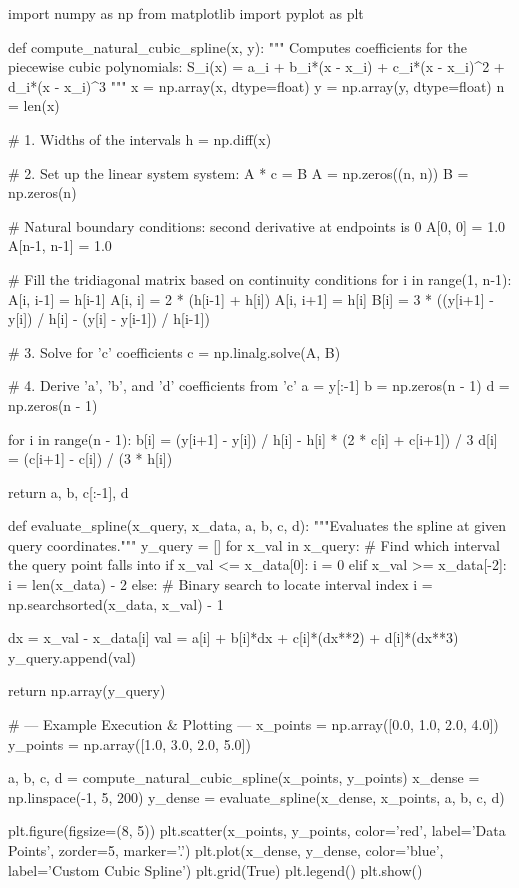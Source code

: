 \documentclass{article}
\begin{document}
\begin{jupytercode}
import numpy as np 
from matplotlib import pyplot as plt 

def compute_natural_cubic_spline(x, y):
    """
    Computes coefficients for the piecewise cubic polynomials:
    S_i(x) = a_i + b_i*(x - x_i) + c_i*(x - x_i)^2 + d_i*(x - x_i)^3
    """
    x = np.array(x, dtype=float)
    y = np.array(y, dtype=float)
    n = len(x)
    
    # 1. Widths of the intervals
    h = np.diff(x)
    
    # 2. Set up the linear system system: A * c = B
    A = np.zeros((n, n))
    B = np.zeros(n)
    
    # Natural boundary conditions: second derivative at endpoints is 0
    A[0, 0] = 1.0
    A[n-1, n-1] = 1.0
    
    # Fill the tridiagonal matrix based on continuity conditions
    for i in range(1, n-1):
        A[i, i-1] = h[i-1]
        A[i, i] = 2 * (h[i-1] + h[i])
        A[i, i+1] = h[i]
        B[i] = 3 * ((y[i+1] - y[i]) / h[i] - (y[i] - y[i-1]) / h[i-1])
        
    # 3. Solve for 'c' coefficients
    c = np.linalg.solve(A, B)
    
    # 4. Derive 'a', 'b', and 'd' coefficients from 'c'
    a = y[:-1]
    b = np.zeros(n - 1)
    d = np.zeros(n - 1)
    
    for i in range(n - 1):
        b[i] = (y[i+1] - y[i]) / h[i] - h[i] * (2 * c[i] + c[i+1]) / 3
        d[i] = (c[i+1] - c[i]) / (3 * h[i])
        
    return a, b, c[:-1], d

def evaluate_spline(x_query, x_data, a, b, c, d):
    """Evaluates the spline at given query coordinates."""
    y_query = []
    for x_val in x_query:
        # Find which interval the query point falls into
        if x_val <= x_data[0]:
            i = 0
        elif x_val >= x_data[-2]:
            i = len(x_data) - 2
        else:
            # Binary search to locate interval index
            i = np.searchsorted(x_data, x_val) - 1
            
        dx = x_val - x_data[i]
        val = a[i] + b[i]*dx + c[i]*(dx**2) + d[i]*(dx**3)
        y_query.append(val)
        
    return np.array(y_query)

# --- Example Execution & Plotting ---
x_points = np.array([0.0, 1.0, 2.0, 4.0])
y_points = np.array([1.0, 3.0, 2.0, 5.0])

a, b, c, d = compute_natural_cubic_spline(x_points, y_points)
x_dense = np.linspace(-1, 5, 200)
y_dense = evaluate_spline(x_dense, x_points, a, b, c, d)

plt.figure(figsize=(8, 5))
plt.scatter(x_points, y_points, color='red', label='Data Points', zorder=5, marker='.')
plt.plot(x_dense, y_dense, color='blue', label='Custom Cubic Spline')
plt.grid(True)
plt.legend()
plt.show()
\end{jupytercode}
\newpage
\end{document}
